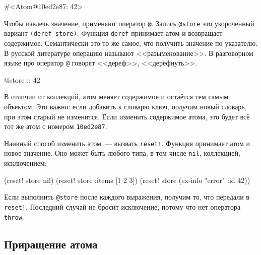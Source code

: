 \begin{english}
  \begin{clojure}
#<Atom@10ed2e87: 42>
  \end{clojure}
\end{english}

\label{deref-intro}

Чтобы извлечь значение, применяют оператор \verb|@|. Запись \verb|@store|
это укороченный вариант \verb|(deref store)|. Функция \verb|deref| принимает
атом и возвращает содержимое. Семантически это то же самое, что получить
значение по указателю. В русской литературе операцию называют
<<разыменование>>. В разговорном языке про оператор \verb|@| говорят
<<дереф>>, <<дерефнуть>>.


\begin{english}
  \begin{clojure}
@store ;; 42
  \end{clojure}
\end{english}

В отличии от коллекций, атом меняет содержимое и остаётся тем самым
объектом. Это важно: если добавить к словарю ключ, получим новый словарь, при
этом старый не изменится. Если изменить содержимое атома, это будет всё тот
же атом с номером \verb|10ed2e87|.


Наивный способ изменить атом~--- вызвать \verb|reset!|. Функция принимает атом
и новое значение. Оно может быть любого типа, в том числе \verb|nil|,
коллекцией, исключением:

\begin{english}
  \begin{clojure}
(reset! store nil)
(reset! store {:items [1 2 3]})
(reset! store (ex-info "error" {:id 42}))
  \end{clojure}
\end{english}

Если выполнить \verb|@store| после каждого выражения, получим то, что передали
в \verb|reset!|. Последний случай не бросит исключение, потому что нет
оператора \verb|throw|.

\subsection{Приращение атома}


